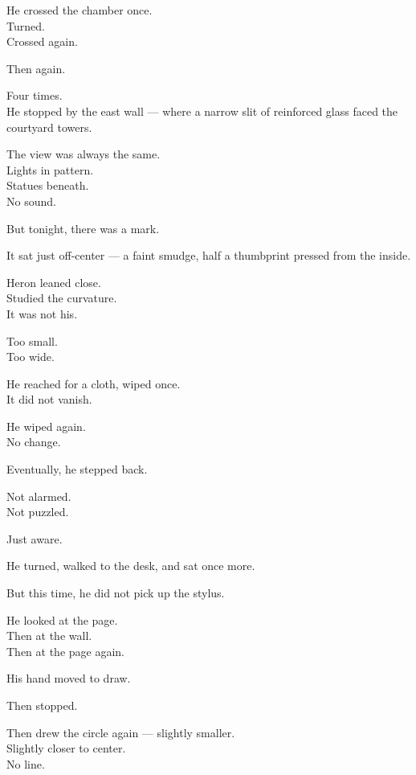 \documentclass[12pt]{article}
\begin{document}
He crossed the chamber once.\\
Turned.\\
Crossed again.

Then again.

Four times.\\
He stopped by the east wall — where a narrow slit of reinforced glass faced the courtyard towers.

\vspace{1em}

The view was always the same.\\
Lights in pattern.\\
Statues beneath.\\
No sound.

But tonight, there was a mark.

\vspace{1em}

It sat just off-center — a faint smudge, half a thumbprint pressed from the inside.

Heron leaned close.\\
Studied the curvature.\\
It was not his.

Too small.\\
Too wide.

\vspace{1em}

He reached for a cloth, wiped once.\\
It did not vanish.

He wiped again.\\
No change.

Eventually, he stepped back.

Not alarmed.\\
Not puzzled.

Just aware.

\vspace{1em}

He turned, walked to the desk, and sat once more.

But this time, he did not pick up the stylus.

He looked at the page.\\
Then at the wall.\\
Then at the page again.

\vspace{1em}

His hand moved to draw.

Then stopped.

Then drew the circle again — slightly smaller.\\
Slightly closer to center.\\
No line.
\end{document}

